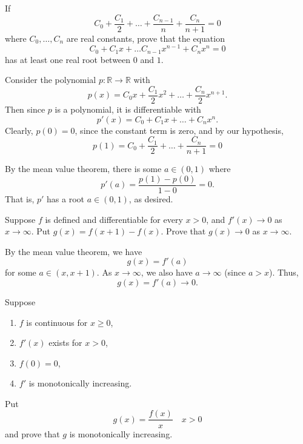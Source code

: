 \documentclass[12 pt, letterpaper]{hmcpset}
\begin{document}
\pagebreak

\begin{problem}
	If
	\[
		C_{0} + \frac{C_{1}}{2} + \dots + \frac{C_{n - 1}}{n} + \frac{C_{n}}{n + 1} = 0
	\]
	where $C_{0}, \dots, C_{n}$ are real constants, prove that the equation
	\[
		C_{0} + C_{1} x + \dots C_{n - 1} x^{n - 1} + C_{n} x^{n} = 0
	\]
	has at least one real root between $0$ and $1$.
\end{problem}

\begin{solution}
	Consider the polynomial $p : \mathbb{R} \to \mathbb{R}$ with
	\[
		p(x) = C_{0} x + \frac{C_{1}}{2} x^{2} + \dots + \frac{C_{n}}{2} x^{n + 1}.
	\]
	Then since $p$ is a polynomial, it is differentiable with
	\[
		p'(x) = C_{0} + C_{1} x + \dots + C_{n} x^{n}.
	\]
	Clearly, $p(0) = 0$, since the constant term is zero, and by our hypothesis,
	\[
		p(1) = C_{0} + \frac{C_{1}}{2} + \dots + \frac{C_{n}}{n + 1} = 0
	\]

	By the mean value theorem, there is some $a \in (0, 1)$ where
	\[
		p'(a) = \frac{p(1) - p(0)}{1 - 0} = 0.
	\]
	That is, $p'$ has a root $a \in (0, 1)$, as desired.
\end{solution}

\pagebreak

\begin{problem}
	Suppose $f$ is defined and differentiable for every $x > 0$, and $f'(x) \to 0$ as $x \to \infty$. Put $g(x) = f(x + 1) - f(x)$. Prove that $g(x) \to 0$ as $x \to \infty$.
\end{problem}

\begin{solution}
	By the mean value theorem, we have
	\[
		g(x) = f'(a)
	\]
	for some $a \in (x, x + 1)$. As $x \to \infty$, we also have $a \to \infty$ (since $a > x$). Thus, 
	\[
		g(x) = f'(a) \to 0.
	\]
\end{solution}

\pagebreak


\begin{problem}
	Suppose
	\begin{enumerate}
		\item $f$ is continuous for $x \ge 0$,
		\item $f'(x)$ exists for $x > 0$,
		\item $f(0) = 0$,
		\item $f'$ is monotonically increasing.
	\end{enumerate}
	Put
	\[
		g(x) = \frac{f(x)}{x} \quad x > 0
	\]
	and prove that $g$ is monotonically increasing.
\end{problem}
\end{document}
